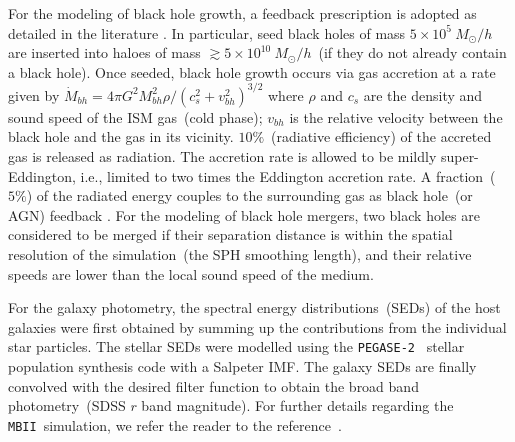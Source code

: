 \documentclass{natureprintstyle}
\newcommand{\mbii}{\texttt{MBII}}
\begin{document}
For the modeling of black hole growth, a feedback prescription is adopted as detailed in the literature \cite{2005Natur.433..604D, 2005MNRAS.361..776S}. In particular, seed black holes of mass $5\times 10^{5}~M_{\odot}/h$ are inserted into haloes of mass $\gtrsim 5\times 10^{10}~M_{\odot}/h$~(if they do not already contain a black hole). Once seeded, black hole growth occurs via gas accretion at a rate given by $\dot{M}_{bh}={4\pi G^2 M_{bh}^2 \rho}/{(c_s^2+v_{bh}^2)^{3/2}}$ where $\rho$ and $c_s$ are the density and sound speed of the ISM gas~(cold phase); $v_{bh}$ is the relative velocity between the black hole and the gas in its vicinity. $10\%$~(radiative efficiency) of the accreted gas is released as radiation. The accretion rate is allowed to be mildly super-Eddington, i.e., limited to two times the Eddington accretion rate. A fraction~($5\%$) of the radiated energy couples to the surrounding gas as black hole~(or AGN) feedback \cite{2005Natur.433..604D}. For the modeling of black hole mergers, two black holes are considered to be merged if their separation distance is within the spatial resolution of the simulation~(the SPH smoothing length), and their relative speeds are lower than the local sound speed of the medium.

For the galaxy photometry, the spectral energy distributions~(SEDs) of the host galaxies were first obtained by summing up the contributions from the individual star particles. The stellar SEDs were modelled using the \texttt{PEGASE-2}~\cite{1999astro.ph.12179F} stellar population synthesis code with a Salpeter IMF. The galaxy SEDs are finally convolved with the desired filter function to obtain the broad band photometry~(SDSS $r$ band magnitude). For further details regarding the \mbii\ simulation, we refer the reader to the reference~\cite{2015MNRAS.450.1349K}.
\end{document}
